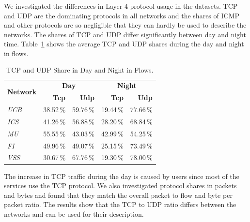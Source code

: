 We investigated the differences in Layer 4 protocol usage in the datasets. TCP and UDP are the dominating protocols in all networks and the shares of ICMP and other protocols are so negligible that they can hardly be used to describe the networks. The shares of TCP and UDP differ significantly between day and night time. Table~\ref{tab:characterization-tcp-udp-share-flows-table} shows the average TCP and UDP shares during the day and night in flows.

\begin{table}[!t]
        \centering
        \renewcommand{\arraystretch}{1.1}
        \begin{tabular}{|l|r|r|r|r|} \hline
                \multirow{2}{*}{\textbf{Network}} & \multicolumn{2}{c|}{\textbf{Day}} & \multicolumn{2}{c|}{\textbf{Night}} \\ \cline{2-5}
                 & \textbf{Tcp} & \textbf{Udp} & \textbf{Tcp} & \textbf{Udp} \\ \hline
                \textit{UCB} & 38.52\,\% & 59.76\,\% & 19.44\,\% & 77.66\,\% \\  \hline
                \textit{ICS} & 41.26\,\% & 56.88\,\% & 28.20\,\% & 68.84\,\%\\  \hline
                \textit{MU} & 55.55\,\% & 43.03\,\% & 42.99\,\% & 54.25\,\% \\  \hline
                \textit{FI} & 49.96\,\% & 49.07\,\% & 25.15\,\% & 73.49\,\% \\  \hline
                \textit{VSS} & 30.67\,\% & 67.76\,\% & 19.30\,\% & 78.00\,\% \\  \hline
        \end{tabular}
        \caption{TCP and UDP Share in Day and Night in Flows.}
        \label{tab:characterization-tcp-udp-share-flows-table}
\end{table}

The increase in TCP traffic during the day is caused by users since most of the services use the TCP protocol. We also investigated protocol shares in packets and bytes and found that they match the overall packet to flow and byte per packet ratio. The results show that the TCP to UDP ratio differs between the networks and can be used for their description.

